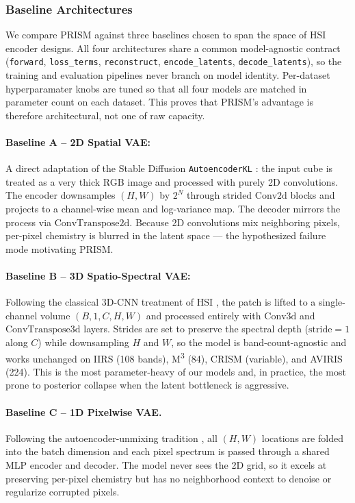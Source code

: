 \documentclass{article} %
\begin{document}
\subsubsection{Baseline Architectures}
\label{sec:models}

We compare PRISM against three baselines chosen to span the space of HSI encoder designs. All four architectures share a common model-agnostic contract (\texttt{forward}, \texttt{loss\_terms}, \texttt{reconstruct}, \texttt{encode\_latents}, \texttt{decode\_latents}), so the training and evaluation pipelines never branch on model identity. Per-dataset hyperparamater knobs are tuned so that all four models are matched in parameter count on each dataset. This proves that PRISM's advantage is therefore architectural, not one of raw capacity.

\paragraph{Baseline A -- 2D Spatial VAE:} A direct adaptation of the Stable Diffusion \texttt{AutoencoderKL} \citep{rombach2022ldm}: the input cube is treated as a very thick RGB image and processed with purely 2D convolutions. The encoder downsamples $(H, W)$ by $2^N$ through strided $\mathrm{Conv2d}$ blocks and projects to a channel-wise mean and log-variance map. The decoder mirrors the process via $\mathrm{ConvTranspose2d}$. Because 2D convolutions mix neighboring pixels, per-pixel chemistry is blurred in the latent space --- the hypothesized failure mode motivating PRISM.

\paragraph{Baseline B -- 3D Spatio-Spectral VAE:} Following the classical 3D-CNN treatment of HSI \citep{chen2016deep}, the patch is lifted to a single-channel volume $(B, 1, C, H, W)$ and processed entirely with $\mathrm{Conv3d}$ and $\mathrm{ConvTranspose3d}$ layers. Strides are set to preserve the spectral depth ($\mathrm{stride}{=}1$ along $C$) while downsampling $H$ and $W$, so the model is band-count-agnostic and works unchanged on IIRS (108 bands), M\textsuperscript{3} (84), CRISM (variable), and AVIRIS (224). This is the most parameter-heavy of our models and, in practice, the most prone to posterior collapse when the latent bottleneck is aggressive.

\paragraph{Baseline C -- 1D Pixelwise VAE.} Following the autoencoder-unmixing tradition \citep{palsson2018unmixing, su2019daen}, all $(H, W)$ locations are folded into the batch dimension and each pixel spectrum is passed through a shared MLP encoder and decoder. The model never sees the 2D grid, so it excels at preserving per-pixel chemistry but has no neighborhood context to denoise or regularize corrupted pixels.
\end{document}
